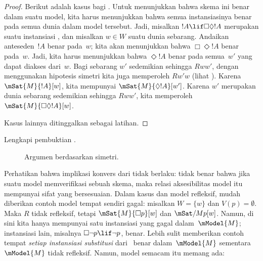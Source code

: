 \documentclass[../../../include/open-logic-section]{subfiles}
\begin{document}
\begin{proof}
  Berikut adalah kasus bagi . Untuk menunjukkan bahwa skema ini benar
  dalam suatu model, kita harus menunjukkan bahwa semua instansiasinya benar
  pada semua dunia dalam model tersebut. Jadi, misalkan
  $!A\lif\Box\Diamond !A$ merupakan suatu instansiasi , dan misalkan
  $w\in W$ suatu dunia sebarang. Andaikan anteseden~$!A$ benar pada~$w$;
  kita akan menunjukkan bahwa $\Box\Diamond !A$ benar pada~$w$. Jadi, kita
  harus menunjukkan bahwa $\Diamond !A$ benar pada semua~$w'$ yang dapat
  diakses dari~$w$. Bagi sebarang $w'$ sedemikian sehingga $Rww'$, dengan
  menggunakan hipotesis simetri kita juga memperoleh $Rw'w$ (lihat
  ). Karena $\mSat{M}{!A}[w]$, kita mempunyai
  $\mSat{M}{\Diamond !A}[w']$. Karena $w'$ merupakan dunia sebarang sedemikian
  sehingga $Rww'$, kita memperoleh $\mSat{M}{\Box\Diamond !A}[w]$.

  Kasus lainnya ditinggalkan sebagai latihan.
\end{proof}

\begin{prob}
  Lengkapi pembuktian .
\end{prob}

\begin{figure}
  \begin{center}
  \end{center}
\caption{Argumen berdasarkan simetri.}
\end{figure}

Perhatikan bahwa implikasi konvers dari  tidak
berlaku: tidak benar bahwa jika suatu model memverifikasi sebuah skema, maka
relasi aksesibilitas model itu mempunyai sifat yang bersesuaian. Dalam kasus
 dan model refleksif, mudah diberikan contoh model tempat  sendiri
gagal: misalkan $W=\{w\}$ dan $V(p)=\emptyset$. Maka $R$ tidak refleksif,
tetapi $\mSat{M}{\Box p}[w]$ dan $\mSat/{M}{p}[w]$. Namun, di sini kita hanya
mempunyai satu instansiasi  yang gagal dalam~$\mModel{M}$;
instansiasi lain, misalnya $\Box\lnot p\lif\lnot p$, benar. Lebih sulit
memberikan contoh tempat \emph{setiap instansiasi substitusi} dari~
benar dalam~$\mModel{M}$ sementara $\mModel{M}$ tidak refleksif. Namun,
model semacam itu memang ada:
\end{document}
